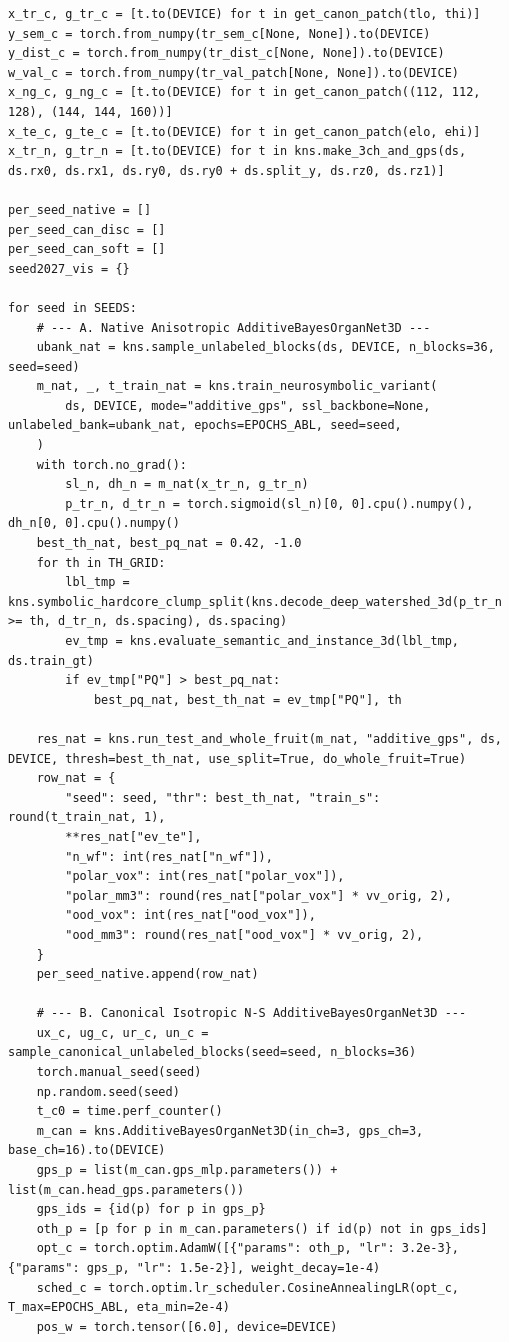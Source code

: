 \documentclass[10pt,a4paper]{article}
\renewcommand{\_}{\origunderscore\allowbreak}
\begin{document}
\begin{codebox}
\begin{lstlisting}[style=pybmed]
x_tr_c, g_tr_c = [t.to(DEVICE) for t in get_canon_patch(tlo, thi)]
y_sem_c = torch.from_numpy(tr_sem_c[None, None]).to(DEVICE)
y_dist_c = torch.from_numpy(tr_dist_c[None, None]).to(DEVICE)
w_val_c = torch.from_numpy(tr_val_patch[None, None]).to(DEVICE)
x_ng_c, g_ng_c = [t.to(DEVICE) for t in get_canon_patch((112, 112, 128), (144, 144, 160))]
x_te_c, g_te_c = [t.to(DEVICE) for t in get_canon_patch(elo, ehi)]
x_tr_n, g_tr_n = [t.to(DEVICE) for t in kns.make_3ch_and_gps(ds, ds.rx0, ds.rx1, ds.ry0, ds.ry0 + ds.split_y, ds.rz0, ds.rz1)]

per_seed_native = []
per_seed_can_disc = []
per_seed_can_soft = []
seed2027_vis = {}

for seed in SEEDS:
    # --- A. Native Anisotropic AdditiveBayesOrganNet3D ---
    ubank_nat = kns.sample_unlabeled_blocks(ds, DEVICE, n_blocks=36, seed=seed)
    m_nat, _, t_train_nat = kns.train_neurosymbolic_variant(
        ds, DEVICE, mode="additive_gps", ssl_backbone=None, unlabeled_bank=ubank_nat, epochs=EPOCHS_ABL, seed=seed,
    )
    with torch.no_grad():
        sl_n, dh_n = m_nat(x_tr_n, g_tr_n)
        p_tr_n, d_tr_n = torch.sigmoid(sl_n)[0, 0].cpu().numpy(), dh_n[0, 0].cpu().numpy()
    best_th_nat, best_pq_nat = 0.42, -1.0
    for th in TH_GRID:
        lbl_tmp = kns.symbolic_hardcore_clump_split(kns.decode_deep_watershed_3d(p_tr_n >= th, d_tr_n, ds.spacing), ds.spacing)
        ev_tmp = kns.evaluate_semantic_and_instance_3d(lbl_tmp, ds.train_gt)
        if ev_tmp["PQ"] > best_pq_nat:
            best_pq_nat, best_th_nat = ev_tmp["PQ"], th

    res_nat = kns.run_test_and_whole_fruit(m_nat, "additive_gps", ds, DEVICE, thresh=best_th_nat, use_split=True, do_whole_fruit=True)
    row_nat = {
        "seed": seed, "thr": best_th_nat, "train_s": round(t_train_nat, 1),
        **res_nat["ev_te"],
        "n_wf": int(res_nat["n_wf"]),
        "polar_vox": int(res_nat["polar_vox"]),
        "polar_mm3": round(res_nat["polar_vox"] * vv_orig, 2),
        "ood_vox": int(res_nat["ood_vox"]),
        "ood_mm3": round(res_nat["ood_vox"] * vv_orig, 2),
    }
    per_seed_native.append(row_nat)

    # --- B. Canonical Isotropic N-S AdditiveBayesOrganNet3D ---
    ux_c, ug_c, ur_c, un_c = sample_canonical_unlabeled_blocks(seed=seed, n_blocks=36)
    torch.manual_seed(seed)
    np.random.seed(seed)
    t_c0 = time.perf_counter()
    m_can = kns.AdditiveBayesOrganNet3D(in_ch=3, gps_ch=3, base_ch=16).to(DEVICE)
    gps_p = list(m_can.gps_mlp.parameters()) + list(m_can.head_gps.parameters())
    gps_ids = {id(p) for p in gps_p}
    oth_p = [p for p in m_can.parameters() if id(p) not in gps_ids]
    opt_c = torch.optim.AdamW([{"params": oth_p, "lr": 3.2e-3}, {"params": gps_p, "lr": 1.5e-2}], weight_decay=1e-4)
    sched_c = torch.optim.lr_scheduler.CosineAnnealingLR(opt_c, T_max=EPOCHS_ABL, eta_min=2e-4)
    pos_w = torch.tensor([6.0], device=DEVICE)


\end{lstlisting}
\end{codebox}
\end{document}
